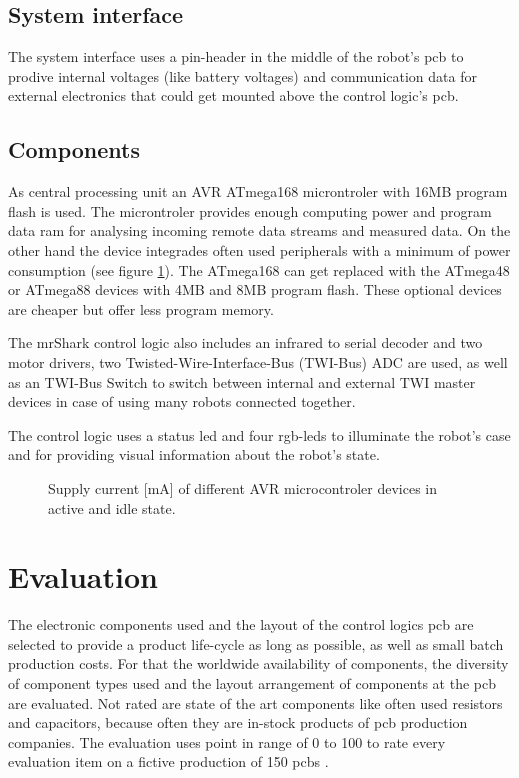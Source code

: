 \documentclass{acm_proc_article-sp}
\begin{document}
\subsection{System interface}
The system interface uses a pin-header in the middle of the robot's pcb to
prodive internal voltages (like battery voltages) and communication data for
external electronics that could get mounted above the control logic's pcb.

\subsection{Components}
As central processing unit an AVR ATmega168 microntroler with 16MB program flash
is used. The microntroler provides enough computing power and program data ram
for analysing incoming remote data streams and measured data. On the other hand
the device integrades often used peripherals with a minimum of power consumption
(see figure \ref{fig:avrsupplycurrent}). The ATmega168 can get replaced with
the ATmega48 or ATmega88 devices with 4MB and 8MB program flash. These optional
devices are cheaper but offer less program memory.

The mrShark control logic also includes an infrared to serial decoder and two
motor drivers, two Twisted-Wire-Interface-Bus (TWI-Bus) ADC are used, as well
as an TWI-Bus Switch to switch between internal and external TWI master devices
in case of using many robots connected together.

The control logic uses a status led and four rgb-leds to illuminate the robot's
case and for providing visual information about the robot's state.

\begin{figure}
\centering
{}
\caption{Supply current [mA] of different AVR microcontroler devices in active
and idle state.}
\label{fig:avrsupplycurrent}
\end{figure}


\section{Evaluation}
The electronic components used and the layout of the
control logics pcb are selected to  provide a product life-cycle as long as
possible, as well as small batch production costs. For that the worldwide
availability of components, the diversity of component types used and the layout
arrangement of components at the pcb are evaluated. Not rated are state of the
art components like often used resistors and capacitors, because often they are
in-stock products of pcb production companies. The evaluation uses point in
range of 0 to 100 to rate every evaluation item on a fictive production of 150
pcbs \cite{eilers:13}.
\end{document}
